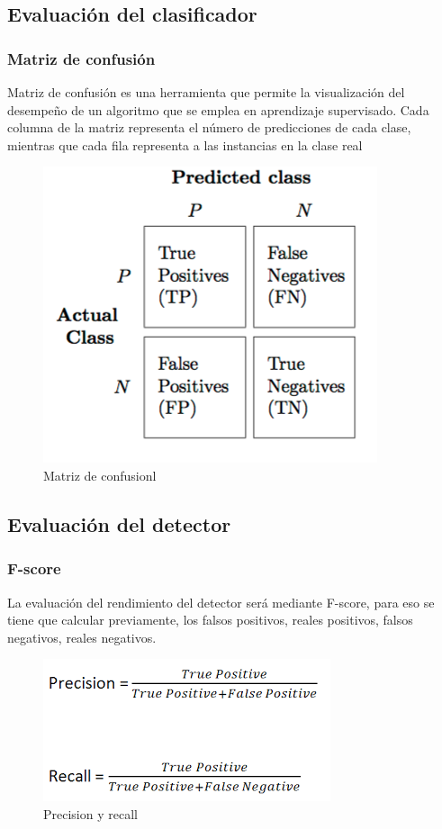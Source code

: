 \documentclass[a4paper,11pt]{report}
\begin{document}
\subsection{Evaluación del clasificador}
\subsubsection{Matriz de confusión}
Matriz de confusión es una herramienta que permite la visualización del desempeño de un algoritmo que se emplea en aprendizaje supervisado. Cada columna de la matriz representa el número de predicciones de cada clase, mientras que cada fila representa a las instancias en la clase real

\begin{figure}[h]
	\centering
	\includegraphics[scale=0.4]{confusion}
	\caption{Matriz de confusionl}
	\label{fig:Matriz de confusion}
\end{figure}

\subsection{Evaluación del detector}
\subsubsection{F-score}
La evaluación del rendimiento del detector será mediante F-score, para eso se tiene que calcular previamente, los falsos positivos, reales positivos, falsos negativos, reales negativos.

\begin{figure}[h]
	\centering
	\includegraphics[scale=0.6]{Metodologia}
	\caption{Precision y recall}
	\label{fig:Precision y recall}
\end{figure}
\end{document}

